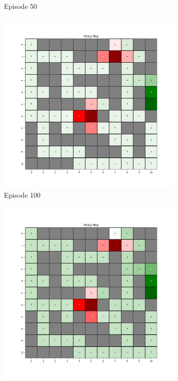 \documentclass{assignment}
\begin{document}
\begin{figure}[H]
\begin{subfigure}{0.3\textwidth}
    \caption{Episode 50}
    \end{subfigure}\hfill
    \begin{subfigure}{0.3\textwidth}
        \includegraphics[width=\textwidth]{figures/policy_td/gamma_sweep/policy_alpha_0.1_gamma_0.5_epsilon_0.2_iteration_100.png}
    \caption{Episode 100}
    \end{subfigure}
    \begin{subfigure}{0.3\textwidth}
        \includegraphics[width=\textwidth]{figures/policy_td/gamma_sweep/policy_alpha_0.1_gamma_0.5_epsilon_0.2_iteration_1000.png}

\end{subfigure}
\end{figure}
\end{document}
